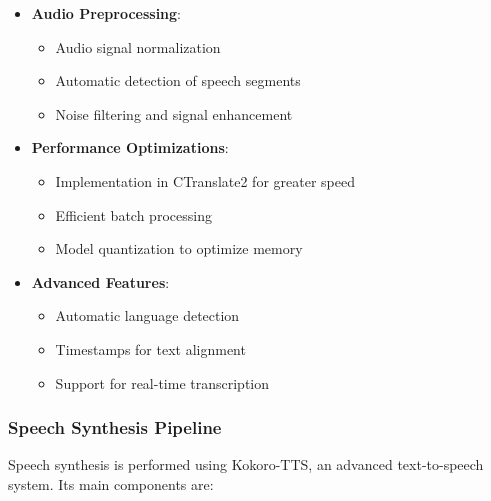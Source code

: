 \begin{itemize}
    \item \textbf{Audio Preprocessing}:
    \begin{itemize}
        \item Audio signal normalization
        \item Automatic detection of speech segments
        \item Noise filtering and signal enhancement
    \end{itemize}

    \item \textbf{Performance Optimizations}:
    \begin{itemize}
        \item Implementation in CTranslate2 for greater speed
        \item Efficient batch processing
        \item Model quantization to optimize memory
    \end{itemize}

    \item \textbf{Advanced Features}:
    \begin{itemize}
        \item Automatic language detection
        \item Timestamps for text alignment
        \item Support for real-time transcription
    \end{itemize}
\end{itemize}

\subsubsection{Speech Synthesis Pipeline}

Speech synthesis is performed using Kokoro-TTS, an advanced text-to-speech system. Its main components are:

